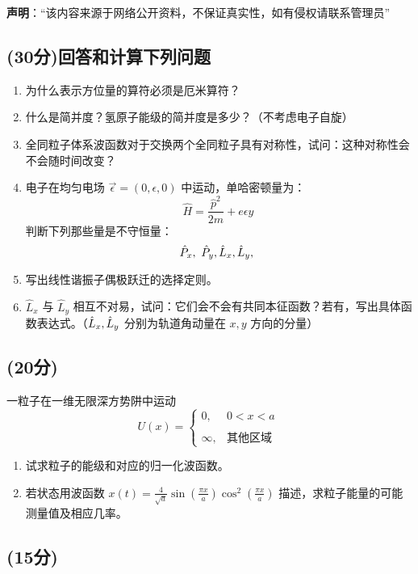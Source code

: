 
\textbf{声明}：“该内容来源于网络公开资料，不保证真实性，如有侵权请联系管理员”

\subsection{(30分)回答和计算下列问题}
\begin{enumerate}
    \item 为什么表示方位量的算符必须是厄米算符？
    \item 什么是简并度？氢原子能级的简并度是多少？（不考虑电子自旋）
    \item 全同粒子体系波函数对于交换两个全同粒子具有对称性，试问：这种对称性会不会随时间改变？
    \item 电子在均匀电场 $\vec{\epsilon}=(0, \epsilon, 0)$ 中运动，单哈密顿量为：
      \[      \hat{H} = \frac{\hat{p}^2}{2m} + e\epsilon y ~\]
      判断下列那些量是不守恒量：
      \[      \hat{P}_x,\ \hat{P}_y,\\  \hat{L}_x,\\ \hat{L}_y,\\  ~\]
    \item 写出线性谐振子偶极跃迁的选择定则。
    \item $\hat{L}_x$ 与 $\hat{L}_y$ 相互不对易，试问：它们会不会有共同本征函数？若有，写出具体函数表达式。（$\hat{L}_x,\\ \hat{L}_y$ 分别为轨道角动量在 $x, y$ 方向的分量）
  \end{enumerate}
  
\subsection{(20分)}
一粒子在一维无限深方势阱中运动
  \[  U(x) =  \begin{cases}    0, & 0 < x < a \\\\    \infty, & \text{其他区域}  \end{cases} ~\]
  \begin{enumerate}
    \item 试求粒子的能级和对应的归一化波函数。
    \item 若状态用波函数 $x(t) = \frac{4}{\sqrt{a}} \sin\left( \frac{\pi x}{a} \right) \cos^2\left( \frac{\pi x}{a} \right)$ 描述，求粒子能量的可能测量值及相应几率。
  \end{enumerate}
\subsection{(15分)}
